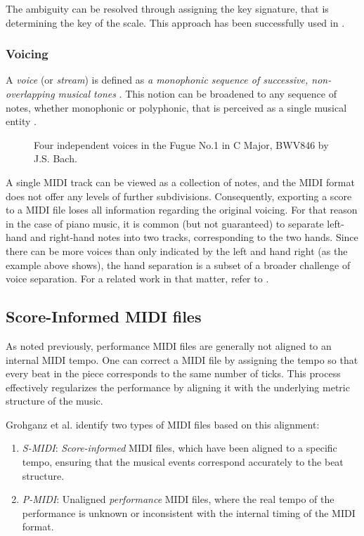 The ambiguity can be resolved through assigning the key signature, that is determining the key of the scale. This approach has been successfully used in \cite{Liu2022}.

\subsubsection{Voicing}

A \emph{voice} (or \emph{stream}) is defined as \emph{a monophonic sequence of successive, non-overlapping musical tones} \cite{Karydis2007}. This notion can be broadened to any sequence of notes, whether monophonic or polyphonic, that is perceived as a single musical entity \cite{Cambouropoulos2008}.

\begin{figure}[ht!]
\centering

\caption[Four independent voices in the Fugue No.1 in C Major, BWV846 by J.S. Bach.]{Four independent voices in the Fugue No.1 in C Major, BWV846 by J.S. Bach.}
\end{figure}

A single MIDI track can be viewed as a collection of notes, and the MIDI format does not offer any levels of further subdivisions. Consequently, exporting a score to a MIDI file loses all information regarding the original voicing. For that reason in the case of piano music, it is common (but not guaranteed) to separate left-hand and right-hand notes into two tracks, corresponding to the two hands. Since there can be more voices than only indicated by the left and hand right (as the example above shows), the hand separation is a subset of a broader challenge of voice separation. For a related work in that matter, refer to \cite{Karydis2007}.
	
\subsection{Score-Informed MIDI files}\label{score-informed_midi_files}

As noted previously, performance MIDI files are generally not aligned to an internal MIDI tempo. One can correct a MIDI file by assigning the tempo so that every beat in the piece corresponds to the same number of ticks. This process effectively regularizes the performance by aligning it with the underlying metric structure of the music.

Grohganz et al. \cite{Grohganz2014} identify two types of MIDI files based on this alignment: \begin{enumerate}
	\item \emph{S-MIDI}: \emph{Score-informed} MIDI files, which have been aligned to a specific tempo, ensuring that the musical events correspond accurately to the beat structure.
	\item \emph{P-MIDI}: Unaligned \emph{performance} MIDI files, where the real tempo of the performance is unknown or inconsistent with the internal timing of the MIDI format. \end{enumerate}

